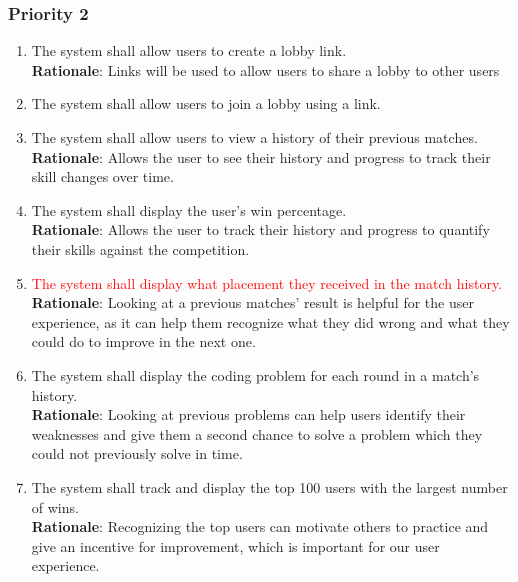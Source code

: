 \documentclass[12pt, titlepage]{article}
\begin{document}
\subsubsection{Priority 2}
\begin{enumerate}[label=FR.\arabic*, resume]
    \item The system shall allow users to create a lobby link. \label{FR.19}\\
     \textbf{Rationale}: Links will be used to allow users to share a lobby to other users
    \item The system shall allow users to join a lobby using a link. \label{FR.20}\\
    \item The system shall allow users to view a history of their previous matches. \label{FR.21}
     \textbf{Rationale}: Allows the user to see their history and progress to track their skill changes over time.
    \item The system shall display the user's win percentage. \label{FR.22}\\
     \textbf{Rationale}: Allows the user to track their history and progress to quantify their skills against the competition.
    \item \textcolor{red}{The system shall display what placement they received in the match history.} \\
    \textbf{Rationale}: Looking at a previous matches' result is helpful for the user experience, as it can help them recognize what they did wrong and what they could do to improve in the next one.
    \label{FR.23}
    \item The system shall display the coding problem for each round in a match's history.\\
    \textbf{Rationale}: Looking at previous problems can help users identify their weaknesses and give them a second chance to solve a problem which they could not previously solve in time. \label{FR.24}
    \item The system shall track and display the top 100 users with the largest number of wins. \label{FR.25}\\
    \textbf{Rationale}: Recognizing the top users can motivate others to practice and give an incentive for improvement, which is important for our user experience. 

\end{enumerate}
\end{document}
